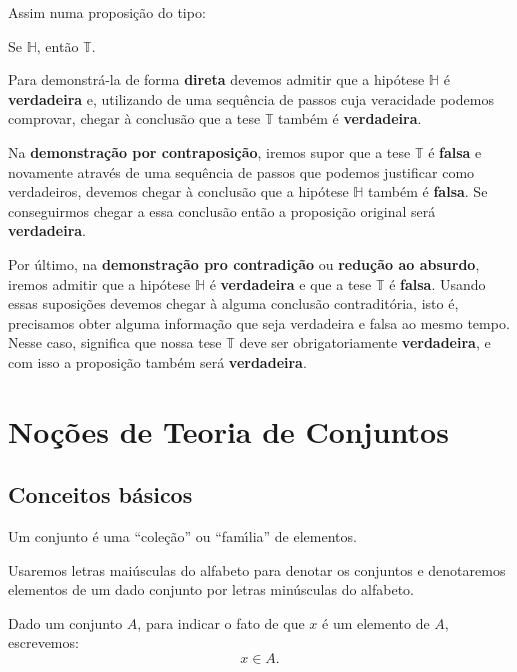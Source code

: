 Assim numa proposi\c{c}\~ao do tipo:
\begin{center}
    Se $\mathbb{H}$, ent\~ao $\mathbb{T}$.
\end{center}

Para demonstr\'a-la de forma \textbf{direta} devemos admitir que a hip\'otese $\mathbb{H}$ \'e \textbf{verdadeira} e, utilizando de uma sequ\^encia de passos
cuja veracidade podemos comprovar, chegar \`a conclus\~ao que a tese $\mathbb{T}$ tamb\'em \'e \textbf{verdadeira}.

Na \textbf{demonstra\c{c}\~ao por contraposi\c{c}\~ao}, iremos supor que a tese $\mathbb{T}$ \'e \textbf{falsa} e novamente atrav\'es de uma
sequ\^encia de passos que podemos justificar como verdadeiros, devemos chegar \`a conclus\~ao que a hip\'otese $\mathbb{H}$ tamb\'em \'e
\textbf{falsa}. Se conseguirmos chegar a essa conclus\~ao ent\~ao a proposi\c{c}\~ao original ser\'a \textbf{verdadeira}.

Por \'ultimo, na \textbf{demonstra\c{c}\~ao pro contradi\c{c}\~ao} ou \textbf{redu\c{c}\~ao ao absurdo}, iremos admitir que a hip\'otese
$\mathbb{H}$ \'e \textbf{verdadeira} e que a tese $\mathbb{T}$ \'e \textbf{falsa}. Usando essas suposi\c{c}\~oes devemos chegar \`a alguma
conclus\~ao contradit\'oria, isto \'e, precisamos obter alguma informa\c{c}\~ao que seja verdadeira e falsa ao mesmo tempo. Nesse caso,
significa que nossa tese $\mathbb{T}$ deve ser obrigatoriamente \textbf{verdadeira}, e com isso a proposi\c{c}\~ao tamb\'em ser\'a
\textbf{verdadeira}.



\chapter{No{\c c}{\~o}es de Teoria de Conjuntos}
\section{Conceitos b{\'a}sicos}

Um conjunto {\'e} uma ``cole{\c c}{\~a}o'' ou ``fam{\'\i}lia'' de elementos.

Usaremos letras mai{\'u}sculas do alfabeto para denotar os conjuntos e denotaremos elementos de um dado conjunto por letras min{\'u}sculas do alfabeto.

Dado um conjunto $A$, para indicar o fato de que $x$ {\'e} um elemento de $A$, escrevemos:
\[
    x \in A.
\]

